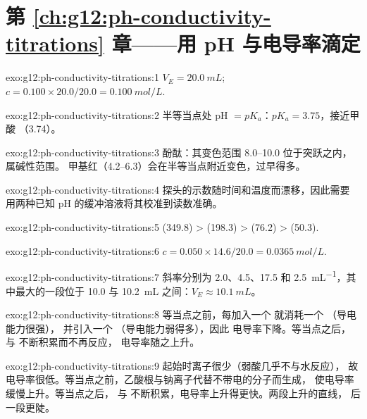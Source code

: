 \section*{第 \ref{ch:g12:ph-conductivity-titrations} 章——用 pH 与电导率滴定}

\begin{solution}{exo:g12:ph-conductivity-titrations:1}
$V_E = \qty{20.0}{mL}$; $c = 0.100 \times 20.0 / 20.0 = \qty{0.100}{mol/L}$.
\end{solution}

\begin{solution}{exo:g12:ph-conductivity-titrations:2}
半等当点处 pH $= pK_a$：$pK_a = 3.75$，接近甲酸
（3.74）。
\end{solution}

\begin{solution}{exo:g12:ph-conductivity-titrations:3}
酚酞：其变色范围 8.0--10.0 位于突跃之内，属碱性范围。
甲基红（4.2--6.3）会在半等当点附近变色，过早得多。
\end{solution}

\begin{solution}{exo:g12:ph-conductivity-titrations:4}
探头的示数随时间和温度而漂移，因此需要
用两种已知 pH 的缓冲溶液将其校准到读数准确。
\end{solution}

\begin{solution}{exo:g12:ph-conductivity-titrations:5}
 (349.8) >  (198.3) >  (76.2) >  (50.3).
\end{solution}

\begin{solution}{exo:g12:ph-conductivity-titrations:6}
$c = 0.050 \times 14.6 / 20.0 = \qty{0.0365}{mol/L}$.
\end{solution}

\begin{solution}{exo:g12:ph-conductivity-titrations:7}
斜率分别为 2.0、4.5、17.5 和 \qty{2.5}{mL^{-1}}，其中最大的一段位于
10.0 与 \qty{10.2}{mL} 之间：$V_E \approx \qty{10.1}{mL}$。
\end{solution}

\begin{solution}{exo:g12:ph-conductivity-titrations:8}
等当点之前，每加入一个  就消耗一个 （导电能力很强），
并引入一个 （导电能力弱得多），因此
电导率下降。等当点之后， 与  不断积累而不再反应，
电导率随之上升。
\end{solution}

\begin{solution}{exo:g12:ph-conductivity-titrations:9}
起始时离子很少（弱酸几乎不与水反应），
故电导率很低。等当点之前，乙酸根与钠离子代替不带电的分子而生成，
使电导率缓慢上升。等当点之后，
 与  不断积累，电导率上升得更快。两段上升的直线，
后一段更陡。
\end{solution}


